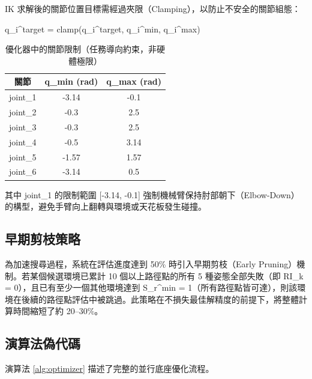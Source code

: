 \documentclass[a4paper, 12pt]{article}
\begin{document}
IK 求解後的關節位置目標需經過夾限（Clamping），以防止不安全的關節組態：
\begin{center}
q\_i\^{}target = clamp(q\_i\^{}target, q\_i\^{}min, q\_i\^{}max)
\end{center}

\begin{table}[H]
\centering
\caption{優化器中的關節限制（任務導向約束，非硬體極限）}
\label{tab:joints}
\begin{tabular}{ccc}
\toprule
\textbf{關節} & q\_min (rad) & q\_max (rad) \\
\midrule
joint\_1 & -3.14 & -0.1 \\
joint\_2 & -0.3  & 2.5  \\
joint\_3 & -0.3  & 2.5  \\
joint\_4 & -0.5  & 3.14 \\
joint\_5 & -1.57 & 1.57 \\
joint\_6 & -3.14 & 0.5  \\
\bottomrule
\end{tabular}
\end{table}

其中 joint\_1 的限制範圍 [-3.14, -0.1] 強制機械臂保持肘部朝下（Elbow-Down）的構型，避免手臂向上翻轉與環境或天花板發生碰撞。

\subsection{早期剪枝策略}
\label{subsec:pruning}

為加速搜尋過程，系統在評估進度達到 50\% 時引入早期剪枝（Early Pruning）機制。若某個候選環境已累計 10 個以上路徑點的所有 5 種姿態全部失敗（即 RI\_k = 0），且已有至少一個其他環境達到 S\_r\^{}min = 1（所有路徑點皆可達），則該環境在後續的路徑點評估中被跳過。此策略在不損失最佳解精度的前提下，將整體計算時間縮短了約 20--30\%。

\subsection{演算法偽代碼}
\label{subsec:pseudocode}

演算法 \ref{alg:optimizer} 描述了完整的並行底座優化流程。
\end{document}
